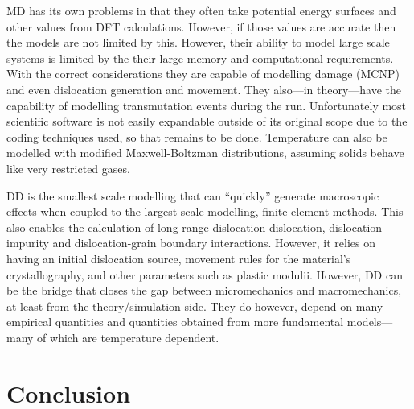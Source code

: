 \documentclass[12pt, a4paper]{article}
\begin{document}
		MD has its own problems in that they often take potential energy surfaces and other values from DFT calculations. However, if those values are accurate then the models are not limited by this. However, their ability to model large scale systems is limited by the their large memory and computational requirements. With the correct considerations they are capable of modelling damage (MCNP) and even dislocation generation and movement. They also---in theory---have the capability of modelling transmutation events during the run. Unfortunately most scientific software is not easily expandable outside of its original scope due to the coding techniques used, so that remains to be done. Temperature can also be modelled with modified Maxwell-Boltzman distributions, assuming solids behave like very restricted gases.
		
		DD is the smallest scale modelling that can ``quickly'' generate macroscopic effects when coupled to the largest scale modelling, finite element methods. This also enables the calculation of long range dislocation-dislocation, dislocation-impurity and dislocation-grain boundary interactions. However, it relies on having an initial dislocation source, movement rules for the material's crystallography, and other parameters such as plastic modulii. However, DD can be the bridge that closes the gap between micromechanics and macromechanics, at least from the theory/simulation side. They do however, depend on many empirical quantities and quantities obtained from more fundamental models---many of which are temperature dependent.
	\section{Conclusion}
		
	
\end{document}
